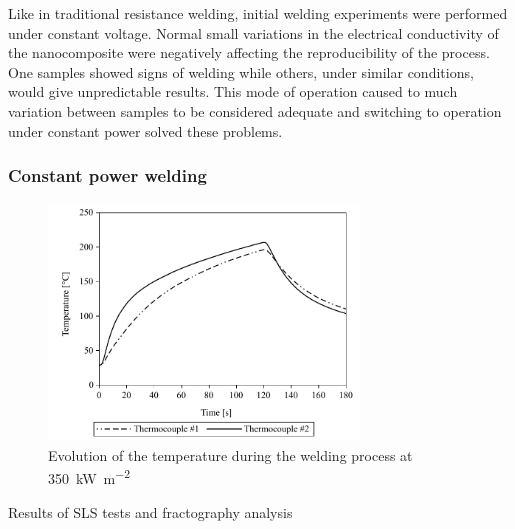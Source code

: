 \documentclass[11pt,review,times]{elsarticle}
\begin{document}
Like in traditional resistance welding, initial welding experiments were performed under constant voltage. 
Normal small variations in the electrical conductivity of the nanocomposite were negatively affecting the reproducibility of the process. 
One samples showed signs of welding while others, under similar conditions, would give unpredictable results. 
This mode of operation caused to much variation between samples to be considered adequate and switching to operation under constant power solved these problems. 

\subsubsection{Constant power welding}
\FloatBarrier





\begin{figure}[h]
	\center
	\captionsetup{width=78mm}
	\includegraphics[width=3.25in]{temp_welding_350kw.pdf}
	\caption{Evolution of the temperature during the welding process at \SI{350}{\kilo\watt\per\square\metre}}
	\label{fig:temp_350kW_120_10_150_3UD}
\end{figure}




\begin{table}[htb]
\centering
{}

\caption{Results of SLS tests and fractography analysis}
\label{tab:SLS_and_fractography_results}
\end{table}
\end{document}
